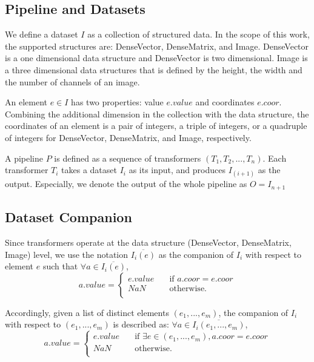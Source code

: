 \documentclass{sig-alternate}
\begin{document}
\subsection{Pipeline and Datasets}
\label{sec:Lin-Pipe-Data}
We define a dataset $I$ as a collection of structured data. In the scope of this work, the supported structures are: 
DenseVector, DenseMatrix, and Image. DenseVector is a one dimensional data structure and DenseVector is
two dimensional. Image is a three dimensional data structures that is defined by the height, the width and the number
of channels of an image. 

An element $e \in I$ has two properties: value $e.value$ and coordinates $e.coor$. 
Combining the additional dimension in the collection with the data structure, 
the coordinates of an element is a pair of integers, a triple of integers, or a quadruple of integers
for DenseVector, DenseMatrix, and Image, respectively.

A pipeline $P$ is defined as a sequence of transformers $(T_1, T_2, ..., T_n)$. 
Each transformer $T_i$ takes a dataset $I_i$ as its input, and produces $I_{(i+1)}$ as the output. 
Especially, we denote the output of the whole pipeline as $O = I_{n+1}$

\subsection{Dataset Companion}
Since transformers operate at the data structure (DenseVector, DenseMatrix, Image) level, we use the notation
$\overline{I_i(e)}$ as the companion of $I_i$ with respect to element $e$ such that $\forall a \in \overline{I_i(e)}$,
\[ a.value =
  \begin{cases}
    e.value       & \quad \text{if } a.coor = e.coor\\
    NaN  & \quad \text{otherwise}. \\
  \end{cases}
\]

Accordingly, given a list of distinct elements $(e_1, ..., e_m)$, the companion of $I_i$ with respect to $(e_1, ..., e_m)$ is
described as: $\forall a \in \overline{I_i(e_1, ..., e_m)}$, 
\[ a.value =
  \begin{cases}
    e.value       & \quad \text{if } \exists e \in (e_1,...,e_m), a.coor = e.coor\\
    NaN  & \quad \text{otherwise}. \\
  \end{cases}
\]
\end{document}
